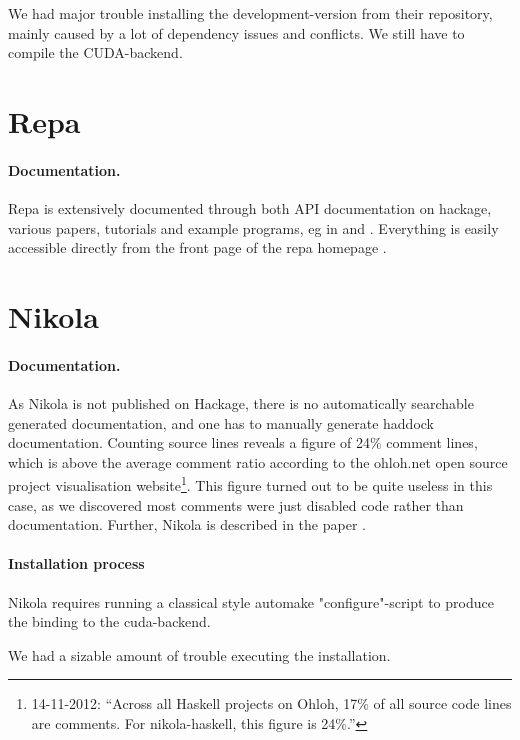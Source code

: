 We had major trouble installing the development-version from their repository,
mainly caused by a lot of dependency issues and conflicts. We still have to
compile the CUDA-backend.  

\section{Repa}

\paragraph{Documentation.} Repa is extensively documented through both API
documentation on hackage, various papers, tutorials and example programs, eg in
\cite{lippmeier2012guiding} and \cite{keller2010regular}.  Everything is easily
accessible directly from the front page of the repa homepage
\cite{homepage:repa}.

\section{Nikola}

\paragraph{Documentation.} As Nikola is not published on Hackage, there is no
automatically searchable generated documentation, and one has to manually
generate haddock documentation. Counting source lines reveals a figure of 24\%
comment lines, which is above the average comment ratio according to the
ohloh.net open source project visualisation website\footnote{14-11-2012:
``Across all Haskell projects on Ohloh, 17\% of all source code lines are
comments. For nikola-haskell, this figure is 24\%.''}. This figure turned out
to be quite useless in this case, as we discovered most comments were just
disabled code rather than documentation. Further, Nikola is described in the
paper \cite{mainland2010nikola}.

\paragraph{Installation process} Nikola requires running a classical style
automake "configure"-script to produce the binding to the cuda-backend.

We had a sizable amount of trouble executing the installation. 

